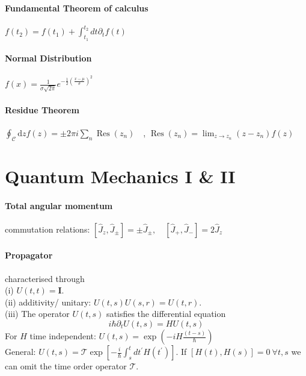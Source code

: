 \paragraph{Fundamental Theorem of calculus} $f\left(t_2\right)=f\left(t_1\right)+\int_{t_1}^{t_2} d t \partial_t f(t)$

\paragraph{Normal Distribution} $f(x)=\frac{1}{\sigma \sqrt{2 \pi}} e^{-\frac{1}{2}\left(\frac{x-\mu}{\sigma}\right)^2}$

\paragraph{Residue Theorem} $\oint_{\mathcal{C}} \mathrm{d} z f(z)=\pm 2 \pi i \sum_n \operatorname{Res}\left(z_n\right) \quad $,
$\operatorname{Res}\left(z_n\right)=\lim _{z \rightarrow z_n}\left(z-z_n\right) f(z)$

\section{Quantum Mechanics I \& II}

\paragraph{Total angular momentum} commutation relations: $\left[\hat{J}_z, \hat{J}_{\pm}\right]=\pm \hat{J}_{\pm}, \quad\left[\hat{J}_{+}, \hat{J}_{-}\right]=2 \hat{J}_z$

\paragraph{Propagator} characterised through \\
(i) $U(t, t)=\mathbf{I}$.\\
(ii) additivity/ unitary: $U(t, s) U(s, r)=U(t, r)$.\\
(iii) The operator $U(t, s)$ satisfies the differential equation
$$
i \hbar \partial_t U(t, s)=H U(t, s)
$$
For $H$ time independent: $U(t, s)=\exp \left(-i H \frac{(t-s)}{\hbar}\right)$\\
General: $U(t, s)=\mathcal{T} \exp \left[-\frac{i}{\hbar} \int_s^t d t^{\prime} H\left(t^{\prime}\right)\right]$. 
If $[H(t),H(s)]=0 \ \forall t,s$ we can omit the time order operator $\mathcal{T}$.

